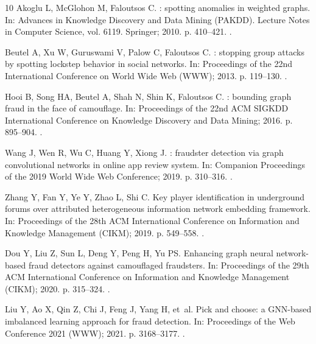 \documentclass[pdflatex,sn-vancouver-num]{sn-jnl}
\begin{document}
\begin{thebibliography}{10}
Akoglu L, McGlohon M, Faloutsos C.
: spotting anomalies in weighted graphs.
\newblock In: Advances in Knowledge Discovery and Data Mining (PAKDD). Lecture
  Notes in Computer Science, vol. 6119. Springer; 2010. p. 410--421.
\newblock {}.

Beutel A, Xu W, Guruswami V, Palow C, Faloutsos C.
: stopping group attacks by spotting lockstep behavior in
  social networks.
\newblock In: Proceedings of the 22nd International Conference on World Wide
  Web (WWW); 2013. p. 119--130.
\newblock {}.

Hooi B, Song HA, Beutel A, Shah N, Shin K, Faloutsos C.
: bounding graph fraud in the face of camouflage.
\newblock In: Proceedings of the 22nd ACM SIGKDD International Conference on
  Knowledge Discovery and Data Mining; 2016. p. 895--904.
\newblock {}.

Wang J, Wen R, Wu C, Huang Y, Xiong J.
: fraudster detection via graph convolutional networks in
  online app review system.
\newblock In: Companion Proceedings of the 2019 World Wide Web Conference;
  2019. p. 310--316.
\newblock {}.

Zhang Y, Fan Y, Ye Y, Zhao L, Shi C.
\newblock Key player identification in underground forums over attributed
  heterogeneous information network embedding framework.
\newblock In: Proceedings of the 28th ACM International Conference on
  Information and Knowledge Management (CIKM); 2019. p. 549--558.
\newblock {}.

Dou Y, Liu Z, Sun L, Deng Y, Peng H, Yu PS.
\newblock Enhancing graph neural network-based fraud detectors against
  camouflaged fraudsters.
\newblock In: Proceedings of the 29th ACM International Conference on
  Information and Knowledge Management (CIKM); 2020. p. 315--324.
\newblock {}.

Liu Y, Ao X, Qin Z, Chi J, Feng J, Yang H, et~al.
\newblock Pick and choose: a {GNN}-based imbalanced learning approach for fraud
  detection.
\newblock In: Proceedings of the Web Conference 2021 (WWW); 2021. p.
  3168--3177.
\newblock {}.


\end{thebibliography}
\end{document}
